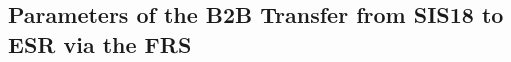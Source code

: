 \begin{longtable*}{ | c | c | c | c | c | c |}
	
    \end{longtable*}
% 
% 

  
\subsection{Parameters of the B2B Transfer from SIS18 to ESR via the FRS}
\label{sec:18toESRvia the FRS}


